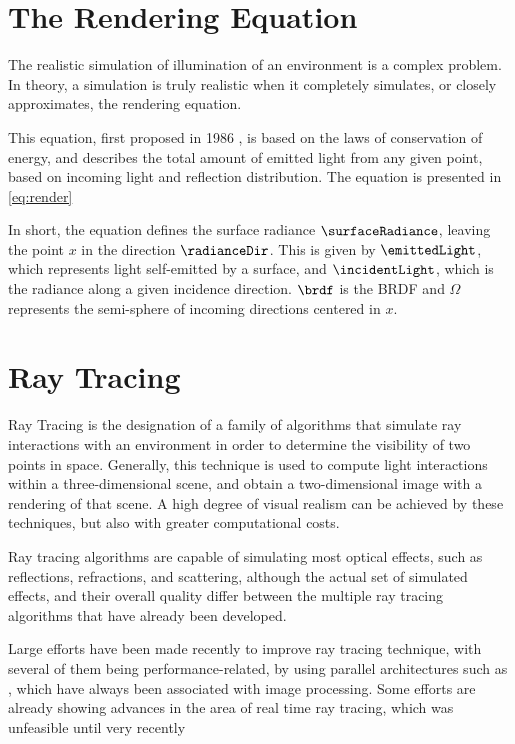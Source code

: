 \documentclass[main.tex]{subfiles}
\begin{document}
\section{The Rendering Equation}

The realistic simulation of illumination of an environment is a complex problem. In theory, a simulation is truly realistic when it completely simulates, or closely approximates, the rendering equation.

This equation, first proposed in 1986 \cite{kajiya1986rendering}, is based on the laws of conservation of energy, and describes the total amount of emitted light from any given point, based on incoming light and reflection distribution. The equation is presented in \cref{eq:render}


In short, the equation defines the surface radiance $\surfaceRadiance$, leaving the point $x$ in the direction $\radianceDir$. This is given by $\emittedLight$, which represents light self-emitted by a surface, and $\incidentLight$, which is the radiance along a given incidence direction. $\brdf$ is the \acf{BRDF} and $\Omega$ represents the semi-sphere of incoming directions centered in $x$.


\section{Ray Tracing} \label{section:ray_tracing}

Ray Tracing is the designation of a family of algorithms that simulate ray interactions with an environment in order to determine the visibility of two points in space.
Generally, this technique is used to compute light interactions within a three-dimensional scene, and obtain a two-dimensional image with a rendering of that scene. A high degree of visual realism can be achieved by these techniques, but also with greater computational costs.

Ray tracing algorithms are capable of simulating most optical effects, such as reflections, refractions, and scattering, although the actual set of simulated effects, and their overall quality differ between the multiple ray tracing algorithms that have already been developed.

Large efforts have been made recently to improve ray tracing technique, with several of them being performance-related, by using parallel architectures such as \gpus, which have always been associated with image processing. Some efforts are already showing advances in the area of real time ray tracing, which was unfeasible until very recently \cite{parker2010optix,huss2004real}
\end{document}

